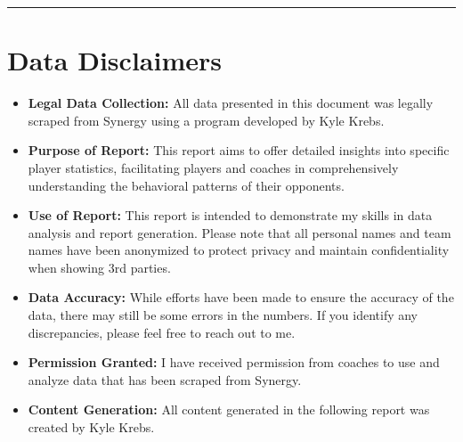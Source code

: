 \documentclass[a4paper,12pt]{article}
\begin{document}
\vspace{0em} %
\hrule height 1pt width 1\textwidth %
\vspace{1em} %

\clearpage


\section*{Data Disclaimers}

\vspace{0.5cm} %

\begin{itemize}[leftmargin=*, label=\textbf{•}]
    \item \textbf{Legal Data Collection:} All data presented in this document was legally scraped from Synergy using a program developed by Kyle Krebs.
    
    \vspace{0.3cm} %

    \item \textbf{Purpose of Report:} This report aims to offer detailed insights into specific player statistics, facilitating players and coaches in comprehensively understanding the behavioral patterns of their opponents.

    \vspace{0.3cm} %
    
    \item \textbf{Use of Report:} This report is intended to demonstrate my skills in data analysis and report generation. Please note that all personal names and team names have been anonymized to protect privacy and maintain confidentiality when showing 3rd parties.
    
    \vspace{0.3cm}
    
    \item \textbf{Data Accuracy:} While efforts have been made to ensure the accuracy of the data, there may still be some errors in the numbers. If you identify any discrepancies, please feel free to reach out to me.
    
    \vspace{0.3cm}
    
    \item \textbf{Permission Granted:} I have received permission from coaches to use and analyze data that has been scraped from Synergy.
    
    \vspace{0.3cm}
    
    \item \textbf{Content Generation:} All content generated in the following report was created by Kyle Krebs.
\end{itemize}
\end{document}
